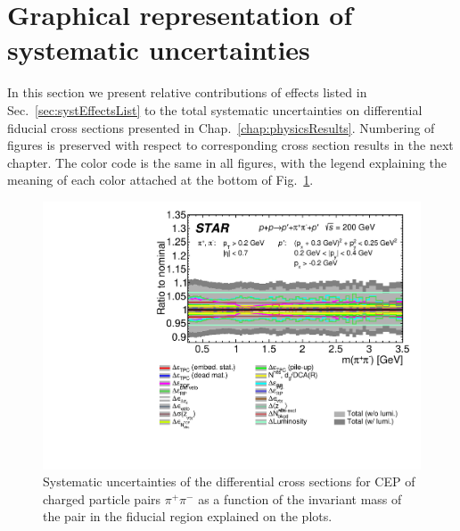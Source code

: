 \section{Graphical representation of systematic uncertainties}
In this section we present relative contributions of effects listed in Sec.~\ref{sec:systEffectsList} to the total systematic uncertainties on differential fiducial cross sections presented in Chap.~\ref{chap:physicsResults}. Numbering of figures is preserved with respect to corresponding cross section results in the next chapter. The color code is the same in all figures, with the legend explaining the meaning of each color attached at the bottom of Fig.~\ref{systematics_01}.


\begin{figure}[h]
\centering
\includegraphics[width=.9\textwidth,page=1]{graphics/systematics/FinalResult_InvMass_pion_Systematics.pdf}
%
\caption{Systematic uncertainties of the differential cross sections for CEP of charged particle pairs $\pi^+\pi^-$ as a function of the invariant mass of the pair in the fiducial region explained on the plots.}
\label{systematics_01}
\end{figure}

